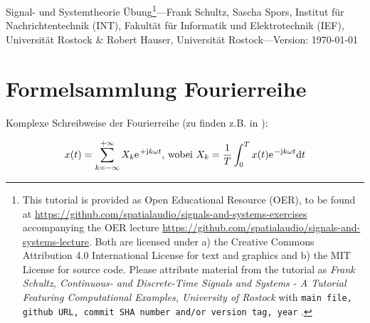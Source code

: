 \documentclass[11pt,a4paper,DIV=12]{scrartcl}
\begin{document}
\noindent Signal- und Systemtheorie Übung\footnote{This tutorial is provided as
Open Educational Resource (OER), to be found at
\url{https://github.com/spatialaudio/signals-and-systems-exercises}
accompanying the OER lecture
\url{https://github.com/spatialaudio/signals-and-systems-lecture}.
%
Both are licensed under a) the Creative Commons Attribution 4.0 International
License for text and graphics and b) the MIT License for source code.
%
Please attribute material from the tutorial as \textit{Frank Schultz,
Continuous- and Discrete-Time Signals and Systems - A Tutorial Featuring
Computational Examples, University of Rostock} with
\texttt{main file, github URL, commit SHA number and/or version tag, year}
.}---Frank Schultz, Sascha Spors,
Institut für Nachrichtentechnik (INT),
Fakultät für Informatik und Elektrotechnik (IEF),
Universität Rostock \&
Robert Hauser, Universität Rostock---Version: \today


\section*{Formelsammlung Fourierreihe}

Komplexe Schreibweise der Fourierreihe (zu finden z.B. in \cite[Kap. 7, S. 475]{Bronstein2015}):

\begin{align}
	x(t)=\sum_{k=-\infty}^{+\infty}X_k\e^{+\im k \omega t}\text{, wobei }X_k=\frac{1}{T}\int_{0}^{T}x(t)\e^{-\im k \omega t}\mathrm{d}t
\end{align}
\end{document}
